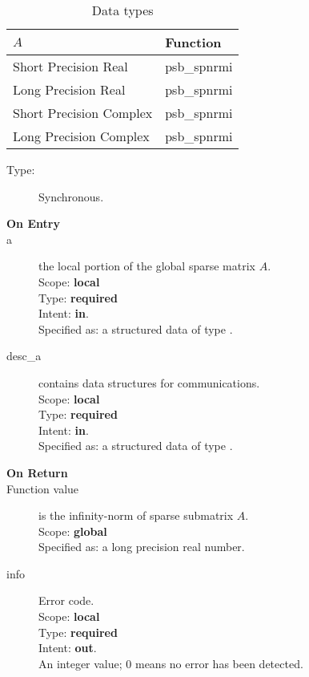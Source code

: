\begin{table}[h]
\begin{center}
\begin{tabular}{ll}
\hline
$A$ & {\bf Function}\\
\hline
Short Precision Real & psb\_spnrmi \\
Long Precision Real & psb\_spnrmi \\
Short Precision Complex & psb\_spnrmi \\
Long Precision Complex & psb\_spnrmi \\
\hline
\end{tabular}
\end{center}
\caption{Data types\label{tab:f90nrmi}}
\end{table}


\begin{description}
\item[Type:] Synchronous.
\item[\bf On Entry]
\item[a] the local  portion of the global sparse matrix
$A$. \\   
Scope: {\bf local} \\
Type: {\bf required}\\
Intent: {\bf in}.\\
Specified as: a structured data of type \spdata.
\item[desc\_a] contains data structures for communications.\\
Scope: {\bf local} \\
Type: {\bf required}\\
Intent: {\bf in}.\\
Specified as: a structured data of type \descdata.
\item[\bf On Return] 
\item[Function value] is the infinity-norm of sparse submatrix $A$.\\
Scope: {\bf global} \\
Specified as: a long precision real number.
\item[info] Error code.\\
Scope: {\bf local} \\
Type: {\bf required} \\
Intent: {\bf out}.\\
An integer value; 0 means no error has been detected. 
\end{description}


